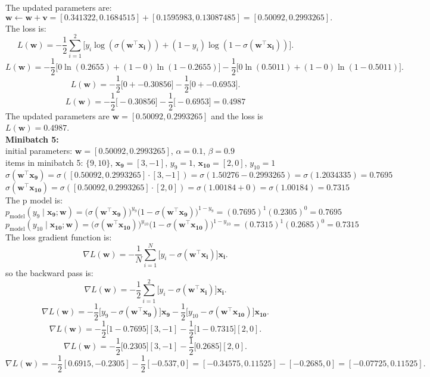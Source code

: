 \documentclass[a3paper,12pt]{article} %
\begin{document}
The updated parameters are:
\[
\mathbf{w} \gets \mathbf{w} + \mathbf{v} = [0.341322, 0.1684515] + [0.1595983, 0.13087485] = [0.50092, 0.2993265].
\]
The loss is:
\[
L(\mathbf{w}) = -\frac{1}{2} \sum^2_{i=1} \big[y_i \log(\sigma(\mathbf{w}^\top \mathbf{x_i})) + (1-y_i) \log(1-\sigma(\mathbf{w}^\top \mathbf{x_i}))\big].
\]
\[
L(\mathbf{w}) = -\frac{1}{2} \big[0 \ln(0.2655) + (1-0) \ln(1-0.2655)\big] - \frac{1}{2} \big[0 \ln(0.5011) + (1-0) \ln(1-0.5011)\big].
\]
\[
L(\mathbf{w}) = -\frac{1}{2} \big[0 + -0.30856\big] - \frac{1}{2} \big[0 + -0.6953\big].
\]
\[
L(\mathbf{w}) = -\frac{1}{2} \big[-0.30856\big] - \frac{1}{2} \big[-0.6953\big] = 0.4987
\]
The updated parameters are \(\mathbf{w} = \mathbf{[0.50092, 0.2993265]}\) and the loss is \(L(\mathbf{w}) = \mathbf{0.4987}\).
\\ \textbf{Minibatch 5:}
\\ initial parameters: \(\mathbf{w} = [0.50092, 0.2993265]\), \(\alpha = 0.1\), \(\beta = 0.9\)
\\ items in minibatch 5: \(\{9, 10\}\), \(\mathbf{x_9} = [3, -1]\), \(y_9 = 1\), \(\mathbf{x_{10}} = [2, 0]\), \(y_{10} = 1\)
\[
\sigma(\mathbf{w}^\top \mathbf{x_9}) = \sigma([0.50092, 0.2993265] \cdot [3, -1]) = \sigma(1.50276 - 0.2993265) = \sigma(1.2034335) = 0.7695
\]
\[
\sigma(\mathbf{w}^\top \mathbf{x_{10}}) = \sigma([0.50092, 0.2993265] \cdot [2, 0]) = \sigma(1.00184 + 0) = \sigma(1.00184) = 0.7315
\]
The p model is:
\[
p_{\text{model}}(y_9 \mid \mathbf{x_9}; \mathbf{w}) = \big(\sigma(\mathbf{w}^\top \mathbf{x_9})\big)^{y_9} \big(1 - \sigma(\mathbf{w}^\top \mathbf{x_9})\big)^{1-y_9} = (0.7695)^1 (0.2305)^0 = 0.7695
\]
\[
p_{\text{model}}(y_{10} \mid \mathbf{x_{10}}; \mathbf{w}) = \big(\sigma(\mathbf{w}^\top \mathbf{x_{10}})\big)^{y_{10}} \big(1 - \sigma(\mathbf{w}^\top \mathbf{x_{10}})\big)^{1-y_{10}} = (0.7315)^1 (0.2685)^0 = 0.7315
\]
The loss gradient function is:
\[
\nabla L(\mathbf{w}) = -\frac{1}{N} \sum^N_{i=1} \big[y_i - \sigma(\mathbf{w}^\top \mathbf{x_i})\big] \mathbf{x_i}.
\]
so the backward pass is:
\[
\nabla L(\mathbf{w}) = -\frac{1}{2} \sum^2_{i=1} \big[y_i - \sigma(\mathbf{w}^\top \mathbf{x_i})\big] \mathbf{x_i}.
\]
\[
\nabla L(\mathbf{w}) = -\frac{1}{2} \big[y_9 - \sigma(\mathbf{w}^\top \mathbf{x_9})\big] \mathbf{x_9} - \frac{1}{2} \big[y_{10} - \sigma(\mathbf{w}^\top \mathbf{x_{10}})\big] \mathbf{x_{10}}.
\]
\[
\nabla L(\mathbf{w}) = -\frac{1}{2} \big[1 - 0.7695\big] [3, -1] - \frac{1}{2} \big[1 - 0.7315\big] [2, 0].
\]
\[
\nabla L(\mathbf{w}) = -\frac{1}{2} \big[0.2305] [3, -1] - \frac{1}{2} \big[0.2685] [2, 0].
\]
\[
\nabla L(\mathbf{w}) = -\frac{1}{2}[0.6915, -0.2305] - \frac{1}{2}[-0.537, 0] = [-0.34575, 0.11525] - [-0.2685, 0] = [-0.07725, 0.11525].
\]
\end{document}
